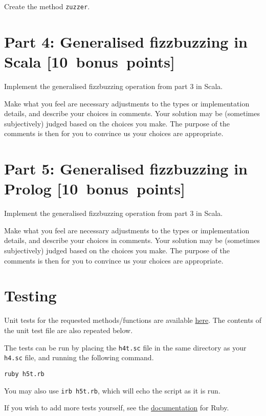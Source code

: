 \documentclass[11pt]{article}
\begin{document}
Create the method \texttt{zuzzer}.

\section*{Part 4: Generalised fizzbuzzing in Scala                [10 bonus points]}
\label{sec:orgea96343}
Implement the generalised fizzbuzzing operation from part 3 in Scala.

Make what you feel are necessary adjustments to the types or
implementation details, and describe your choices in comments.
Your solution may be (sometimes subjectively) judged based on
the choices you make. The purpose of the comments is then
for you to convince us your choices are appropriate.

\section*{Part 5: Generalised fizzbuzzing in Prolog               [10 bonus points]}
\label{sec:org3bd3958}
Implement the generalised fizzbuzzing operation from part 3 in Scala.

Make what you feel are necessary adjustments to the types or
implementation details, and describe your choices in comments.
Your solution may be (sometimes subjectively) judged based on
the choices you make. The purpose of the comments is then
for you to convince us your choices are appropriate.

\section*{Testing}
\label{sec:org099aee9}
Unit tests for the requested methods/functions
are available \href{./testing/h5/h5t.rb}{here}.
The contents of the unit test file are also repeated below.

The tests can be run by placing the \texttt{h4t.sc} file
in the same directory as your \texttt{h4.sc} file, and
running the following command.
\begin{verbatim}
ruby h5t.rb
\end{verbatim}
You may also use \texttt{irb h5t.rb}, which will echo the script
as it is run.

If you wish to add more tests yourself,
see the \href{https://en.wikibooks.org/wiki/Ruby\_Programming/Unit\_testing}{documentation}
for Ruby.
\end{document}
